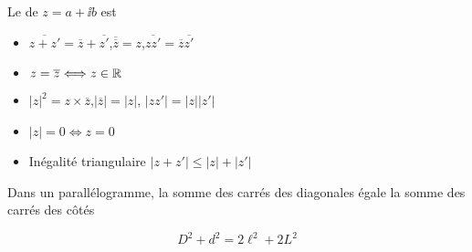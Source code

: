 \begin{frame}
   Le  de $z = a + \ii b$ est \\[0.5em]



 

\pause
\pause
\pause
\pause 

\vspace{-11em}

\begin{itemize}
  \item $\overline{z + z'} = \overline{z} + \overline{z'}$,\quad $\overline{\overline{z}} =
  z$,\quad $\overline{zz'} = \overline{z}  \overline{z'}$
  
  \item $z = \overline{z} \Longleftrightarrow z \in \mathbb{R}$
  
  \item $\left| z \right|^2 = z \times \overline{z}$,\quad $\left| \overline{z} \right| =
  \left| z \right|$, \quad $\left| zz' \right| = \left| z \right|  \left| z'
  \right|$
  
  \item $\left| z \right| = 0 \Longleftrightarrow z = 0$
  
  \item Inégalité triangulaire  $\left| z + z' \right| \leqslant \left| z
  \right| + \left| z' \right|$
\end{itemize}

\end{frame}

\begin{frame}


\begin{exemple}
  Dans un parallélogramme, la somme des carrés des diagonales égale la
  somme des carrés des c\^otés
\end{exemple}


\pause

\vspace{1em}

$$D^2+d^2 = 2\ell^2+2L^2$$
\end{frame}

